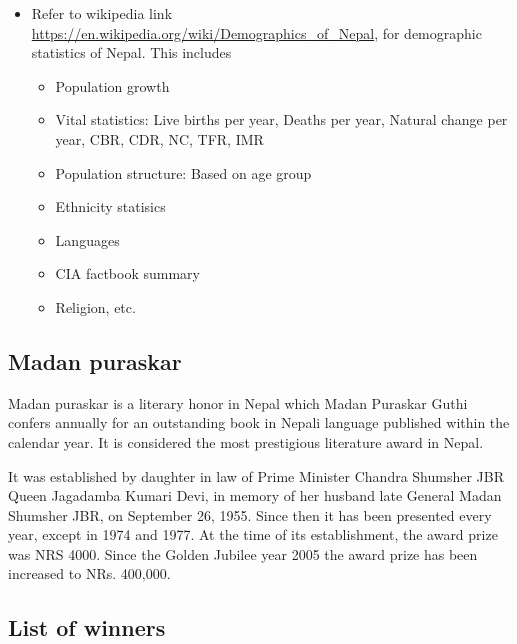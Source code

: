 \documentclass[
  openany]{book}
\providecommand{\tightlist}{%
  \setlength{\itemsep}{0pt}\setlength{\parskip}{0pt}}
\begin{document}
\begin{itemize}
\tightlist
\item
  Refer to wikipedia link \url{https://en.wikipedia.org/wiki/Demographics_of_Nepal}, for demographic statistics of Nepal. This includes

  \begin{itemize}
  \tightlist
  \item
    Population growth
  \item
    Vital statistics: Live births per year, Deaths per year, Natural change per year, CBR, CDR, NC, TFR, IMR
  \item
    Population structure: Based on age group
  \item
    Ethnicity statisics
  \item
    Languages
  \item
    CIA factbook summary
  \item
    Religion, etc.
  \end{itemize}
\end{itemize}

\hypertarget{madan-puraskar}{%
\subsection{Madan puraskar}\label{madan-puraskar}}

Madan puraskar is a literary honor in Nepal which Madan Puraskar Guthi confers annually for an outstanding book in Nepali language published within the calendar year. It is considered the most prestigious literature award in Nepal.

It was established by daughter in law of Prime Minister Chandra Shumsher JBR Queen Jagadamba Kumari Devi, in memory of her husband late General Madan Shumsher JBR, on September 26, 1955. Since then it has been presented every year, except in 1974 and 1977. At the time of its establishment, the award prize was NRS 4000. Since the Golden Jubilee year 2005 the award prize has been increased to NRs. 400,000.

\hypertarget{list-of-winners}{%
\subsection{List of winners}\label{list-of-winners}}

\begingroup\fontsize{8}{10}\selectfont
\end{document}

